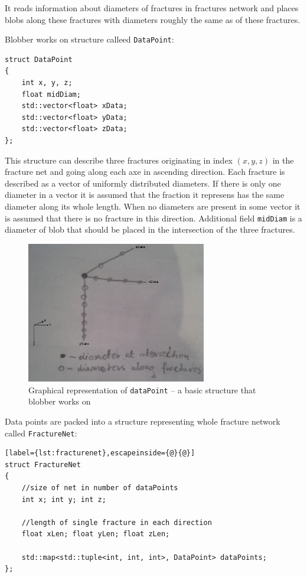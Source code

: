 It reads information about diameters of fractures in fractures network
and places blobs along these fractures with diameters roughly the same as of
these fractures.

Blobber works on structure calleed \texttt{DataPoint}:

\begin{lstlisting}
struct DataPoint
{
  	int x, y, z;
	float midDiam;
	std::vector<float> xData;
	std::vector<float> yData;
	std::vector<float> zData;
};
\end{lstlisting}

This structure can describe three fractures originating in index $(x,y,z)$ in
the fracture net and going along each axe in ascending direction. Each fracture
is described as a vector of uniformly distributed diameters. If there is only
one diameter in a vector it is assumed that the fraction it represens has the
same diameter along its whole length. When no diameters are present in some
vector it is assumed that there is no fracture in this direction.
Additional field \texttt{midDiam} is a diameter of blob that should be placed in
the intersection of the three fractures.

\begin{figure}[hbt]
  \begin{center}
    \includegraphics[width=0.7\textwidth]{chapters/project/datapoint.jpg}
  \end{center}
  \caption{Graphical representation of \texttt{dataPoint} -- a basic structure that
blobber works on}
  \label{fig:datapoint}
\end{figure}

Data points are packed into a structure representing whole fracture network
called \texttt{FractureNet}:
\begin{lstlisting}[label={lst:fracturenet},escapeinside={@}{@}]
struct FractureNet
{
	//size of net in number of dataPoints
	int x; int y; int z;
	
	//length of single fracture in each direction
	float xLen; float yLen; float zLen;
	
	std::map<std::tuple<int, int, int>, DataPoint> dataPoints;
};
\end{lstlisting}

